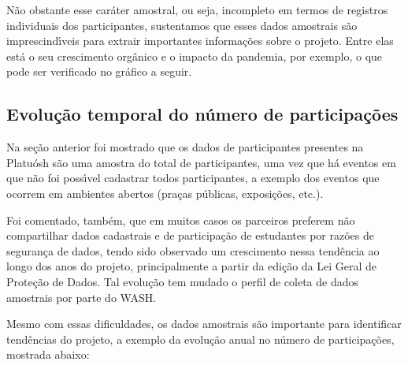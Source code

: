 \documentclass[
12pt,		%
openright,	%
twoside,  %
a4paper,			%
chapter=TITLE,		%
english,			%
french,				%
spanish,			%
brazil				%
]{USPSC-classe/USPSC}
\begin{document}
N\~ao obstante esse car\'ater amostral, ou seja, incompleto em termos de registros individuais dos participantes, sustentamos que esses dados amostrais s\~ao imprescind\'{\i}veis para extrair importantes informa\c{c}\~oes sobre o projeto. Entre elas est\'a o seu crescimento org\^anico e o impacto da pandemia, por exemplo, o que pode ser verificado no gr\'afico a seguir.




\subsection[Evolu\c{c}\~ao temporal do n\'umero de participa\c{c}\~oes]{Evolu\c{c}\~ao temporal do n\'umero de participa\c{c}\~oes}\label{Evolu\c{c}\~ao temporal do n\'umero de participa\c{c}\~oes}
Na se\c{c}\~ao anterior foi mostrado que os dados de participantes presentes na Platu\'osh s\~ao uma amostra do total de participantes, uma vez que h\'a eventos em que n\~ao foi poss\'{\i}vel cadastrar todos participantes, a exemplo dos eventos que ocorrem em ambientes abertos (pra\c{c}as p\'ublicas, exposi\c{c}\~oes, etc.).




Foi comentado, tamb\'em, que em muitos casos os parceiros preferem n\~ao compartilhar dados cadastrais e de participa\c{c}\~ao de estudantes por raz\~oes de seguran\c{c}a de dados, tendo sido observado um crescimento nessa tend\^encia ao longo dos anos do projeto, principalmente a partir da edi\c{c}\~ao da Lei Geral de Prote\c{c}\~ao de Dados. Tal evolu\c{c}\~ao tem mudado o perfil de coleta de dados amostrais por parte do WASH.




Mesmo com essas dificuldades, os dados amostrais s\~ao importante para identificar tend\^encias do projeto, a exemplo da evolu\c{c}\~ao anual no n\'umero de participa\c{c}\~oes, mostrada abaixo:
\end{document}
